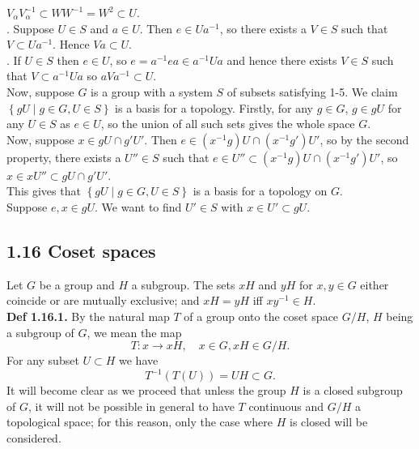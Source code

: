 \documentclass[a4paper]{article}
\theoremstyle{plain}%
\theoremstyle{definition}
\theoremstyle{remark}
\begin{document}
      $V_{\alpha}V_{\alpha}^{-1} \subset W W^{-1} = W^2 \subset U$.\\
      . Suppose $U \in S$ and $a \in U$. Then 
      $e \in U a^{-1}$, so there exists a $V \in S$ such that
      $V \subset U a^{-1}$. Hence
      $Va \subset U$.\\
      . If $U \in S$ then $e \in U$, so
      $e = a^{-1} e a \in a^{-1} U a$ and hence there exists $V \in S$ such
      that
      $V \subset a^{-1} U a$ so
      $a V a^{-1} \subset U$.\\
      \linebreak
      Now, suppose $G$ is a group with a system $S$ of subsets satisfying 1-5.
      We claim $\left\{ gU  \mid g \in G, U \in S \right\} $ is a basis for
      a topology. Firstly, for any $g \in G$, $g \in gU$ for any
      $U \in S$ as $e \in U$, so the union of all such sets gives the whole
      space $G$.\\
      Now, suppose $x \in gU \cap g' U'$. Then
      $e \in \left( x^{-1}g \right) U \cap \left( x^{-1}g' \right) U'$, so
      by the second property, there exists a $U'' \in S$ such that
      $e \in U'' \subset \left( x^{-1}g \right) U \cap 
      \left( x^{-1}g' \right) U'$, so
      $x \in x U'' \subset gU \cap g' U'$.\\
      \linebreak
      This gives that $\left\{ gU  \mid  g\in G, U \in S \right\} $ is a basis
      for a topology on $G$.\\
      Suppose $e,x \in gU$. We want to find $U' \in S$
      with $x \in U' \subset gU$.











    \subsection*{1.16 \quad Coset spaces}
    Let $G$ be a group and $H$ a subgroup.
    The sets $xH$ and $yH$ for $x,y \in G$ either coincide or are mutually
    exclusive; and $xH = yH$ iff $x y^{-1} \in H$.\\
    \linebreak
    \textbf{Def 1.16.1.} By the natural map $T$ of a group onto the coset space
    $G /H$, $H$ being a subgroup of $G$, we mean the map
    \[
    T  \colon x \to xH, \quad x \in G, xH \in G /H.
    \] 
    For any subset $U \subset H$ we have
    \[
    T^{-1}\left( T(U) \right) = UH \subset G.
    \] 
    It will become clear as we proceed that unless the group $H$ is a closed
    subgroup of $G$, it will not be possible in general to have $T$ continuous
    and $G /H$ a topological space; for this reason, only the case where $H$
    is closed will be considered.\\
    \linebreak
    
\end{document}
